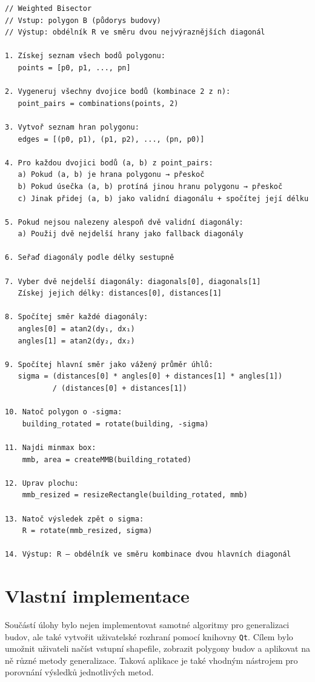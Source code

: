 \documentclass[a4paper,12pt]{article}
\begin{document}
\begin{verbatim}
// Weighted Bisector
// Vstup: polygon B (půdorys budovy)
// Výstup: obdélník R ve směru dvou nejvýraznějších diagonál

1. Získej seznam všech bodů polygonu:
   points = [p0, p1, ..., pn]

2. Vygeneruj všechny dvojice bodů (kombinace 2 z n):
   point_pairs = combinations(points, 2)

3. Vytvoř seznam hran polygonu:
   edges = [(p0, p1), (p1, p2), ..., (pn, p0)]

4. Pro každou dvojici bodů (a, b) z point_pairs:
   a) Pokud (a, b) je hrana polygonu → přeskoč
   b) Pokud úsečka (a, b) protíná jinou hranu polygonu → přeskoč
   c) Jinak přidej (a, b) jako validní diagonálu + spočítej její délku

5. Pokud nejsou nalezeny alespoň dvě validní diagonály:
   a) Použij dvě nejdelší hrany jako fallback diagonály

6. Seřaď diagonály podle délky sestupně

7. Vyber dvě nejdelší diagonály: diagonals[0], diagonals[1]
   Získej jejich délky: distances[0], distances[1]

8. Spočítej směr každé diagonály:
   angles[0] = atan2(dy₁, dx₁)
   angles[1] = atan2(dy₂, dx₂)

9. Spočítej hlavní směr jako vážený průměr úhlů:
   sigma = (distances[0] * angles[0] + distances[1] * angles[1]) 
           / (distances[0] + distances[1])

10. Natoč polygon o -sigma:
    building_rotated = rotate(building, -sigma)

11. Najdi minmax box:
    mmb, area = createMMB(building_rotated)

12. Uprav plochu:
    mmb_resized = resizeRectangle(building_rotated, mmb)

13. Natoč výsledek zpět o sigma:
    R = rotate(mmb_resized, sigma)

14. Výstup: R – obdélník ve směru kombinace dvou hlavních diagonál
\end{verbatim}

\section{Vlastní implementace}

Součástí úlohy bylo nejen implementovat samotné algoritmy pro generalizaci budov, ale také vytvořit uživatelské rozhraní pomocí knihovny \texttt{Qt}. Cílem bylo umožnit uživateli načíst vstupní shapefile, zobrazit polygony budov a aplikovat na ně různé metody generalizace. Taková aplikace je také vhodným nástrojem pro porovnání výsledků jednotlivých metod.
\end{document}
